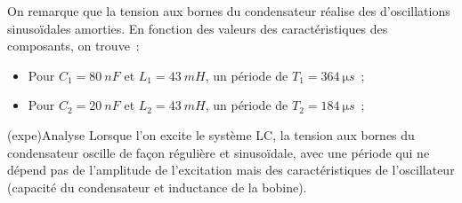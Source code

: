 \documentclass[../../main/main.tex]{subfiles}
\begin{document}
\begin{minipage}{0.50\linewidth}
	\begin{center}
	\end{center}
\end{minipage}
On remarque que la tension aux bornes du condensateur réalise des
d'oscillations sinusoïdales amorties. En fonction des valeurs des
caractéristiques des composants, on trouve~:
\begin{itemize}
	\item Pour $C_1 = \SI{80}{nF}$ et $L_1 = \SI{43}{mH}$, un période de $T_1 =
		      \SI{364}{\micro s}$~;
	\item Pour $C_2 = \SI{20}{nF}$ et $L_2 = \SI{43}{mH}$, un période de $T_2 =
		      \SI{184}{\micro s}$~;
\end{itemize}

\begin{tcb}(expe){Analyse}
	Lorsque l'on excite le système LC, la tension aux bornes du condensateur
	oscille de façon régulière et sinusoïdale, avec une période qui ne dépend pas
	de l'amplitude de l'excitation mais des caractéristiques de l'oscillateur
	(capacité du condensateur et inductance de la bobine).
\end{tcb}
\end{document}
